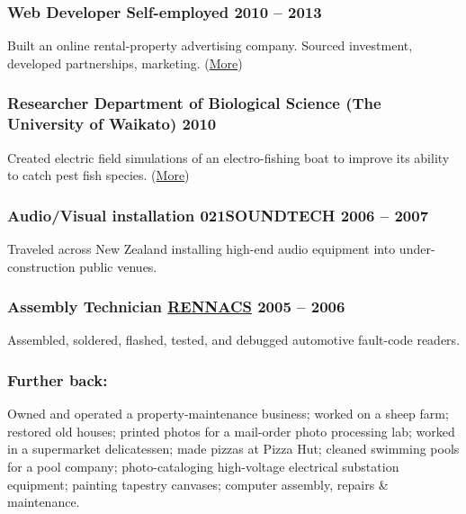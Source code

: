 \documentclass[english]{extarticle}
\begin{document}
\subsubsection*{Web Developer \textmd{\footnotesize Self-employed \hfill{} \textbf{2010 -- 2013}}}
\vspace{-2mm}
Built an online rental-property advertising company. Sourced investment, developed partnerships, marketing. (\href{https://markhedleyjones.com/projects/houser}{More})

\subsubsection*{Researcher \textmd{\footnotesize Department of Biological Science (The University of Waikato) \hfill{} \textbf{2010}}}
\vspace{-2mm}
Created electric field simulations of an electro-fishing boat to improve its ability to catch pest fish species. (\href{https://researchcommons.waikato.ac.nz/bitstream/handle/10289/11289/Use%20of%20Electrofishing.pdf}{More})

\subsubsection*{Audio/Visual installation \textmd{\footnotesize 021SOUNDTECH \hfill{} \textbf{2006 -- 2007}}}
\vspace{-2mm}
Traveled across New Zealand installing high-end audio equipment into under-construction public venues.

\subsubsection*{Assembly Technician \textmd{\footnotesize \href{https://rennacs.com/}{RENNACS} \hfill{} \textbf{2005 -- 2006}}}
\vspace{-2mm}
Assembled, soldered, flashed, tested, and debugged automotive fault-code readers.

\subsubsection*{Further back:}
Owned and operated a property-maintenance business;
worked on a sheep farm;
restored old houses;
printed photos for a mail-order photo processing lab;
worked in a supermarket delicatessen;
made pizzas at Pizza Hut;
cleaned swimming pools for a pool company;
photo-cataloging high-voltage electrical substation equipment;
painting tapestry canvases;
computer assembly, repairs \& maintenance.
\end{document}
